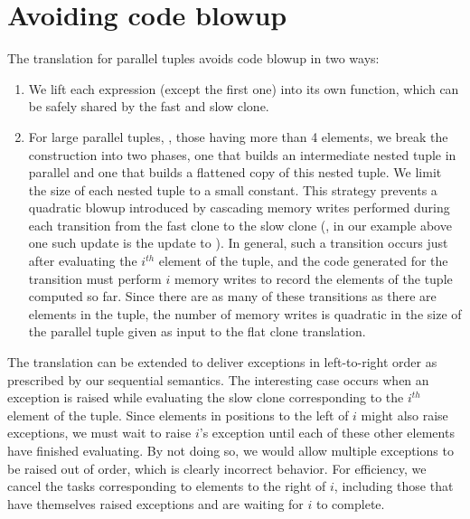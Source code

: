 \documentclass[nocopyrightspace,preprint]{../common/sigplanconf}
\begin{document}
\section{Avoiding code blowup}
\label{sec:avoiding-code-blowup}
The translation for parallel tuples avoids code blowup in two ways:
\begin{enumerate}
\item We lift each expression (except the first one) into its own function,
which can be safely shared by the fast and slow clone.
\item For large parallel tuples, \eg{}, those having more than 4 elements, we 
break the construction into two phases, one that builds an
intermediate nested tuple in parallel and one that builds a flattened
copy of this nested tuple. We limit the size of each nested tuple 
to a small constant. This strategy prevents a quadratic blowup introduced
by cascading memory writes performed during each transition 
from the fast clone to the slow clone (\eg{}, in our  example above
one such update is the update to ). In general, such a
transition occurs just after evaluating 
the $i^{th}$ element of the tuple, and the code generated for the transition
must perform $i$ memory writes to record the elements of the tuple computed so 
far. Since there are as many of these transitions as there are elements in the
tuple, the number of memory writes is quadratic in the size of the parallel 
tuple given as input to the flat clone translation.
\end{enumerate}

The translation can be extended to deliver exceptions in left-to-right order
as prescribed by our sequential semantics. The interesting case
occurs when an exception is raised while evaluating the slow clone 
corresponding to the $i^{th}$ element of the tuple. Since elements in
positions to the left of $i$ might also raise exceptions, we must wait
to raise $i$'s exception until each of these other elements have finished
evaluating. By not doing so, we would allow multiple exceptions to be
raised out of order, which is clearly incorrect behavior. For efficiency, 
we cancel the tasks corresponding to elements to the right of $i$, including
those that have themselves raised exceptions and are waiting for
$i$ to complete.
\end{document}
